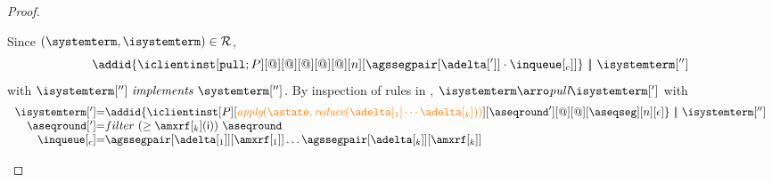 \begin{proof}
\begin{itemize}
\begin{itemize}
				Since $(\systemterm,\isystemterm)\in \mathcal{R}$,
				\[ \addid{\iclientinst[\tpullins][@]
						[@]%
						[@][@][@][n][{\agssegpair[{\adelta[']}]}\cdot\inclient]}
								\ \bigpar \ \isystemterm['']\]
				with $\implements{\isystemterm['']}{\systemterm['']}$. By inspection of rules in \figref{}, 
				$\isystemterm \arroi{\pulltran} \isystemterm[']$ with
				\[\begin{array}{r@{=}l}
					\isystemterm['] & \addid{\iclientinst[P]
						 [\iapply{\known}{\ireduce{\adelta[_1]\cdots\adelta[_k]}}]
						 [\aseqround']
						 [@][@]
						 [{\receivebuffer}][n][\epsilon]}\ \bigpar \ \isystemterm['']	\\
					   \aseqround['] & filter\ (\geq \amxrf[_k](\cid)) \ \aseqround \\
						\inclient & \agssegpair[{\adelta[_1]}][{\amxrf[_1]}]\ldots \agssegpair[{\adelta[_k]}][{\amxrf[_k]}]
				  \end{array}		
				\]
				

\end{itemize}
\end{itemize}
\end{proof}

